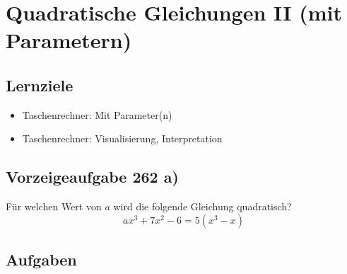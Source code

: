 
\newpage
\section{Quadratische Gleichungen II (mit
  Parametern)}

\subsection*{Lernziele}

\begin{itemize}
\item Taschenrechner: Mit Parameter(n)
\item Taschenrechner: Visualisierung, Interpretation
\end{itemize}

\subsection{Vorzeigeaufgabe 262 a)}
Für welchen Wert von $a$ wird die folgende Gleichung quadratisch?
$$ax^3 + 7x^2 -6 = 5(x^3 -x)$$

\noTRAINER{%
  \vspace{5cm}
}

\subsection{Aufgaben}
